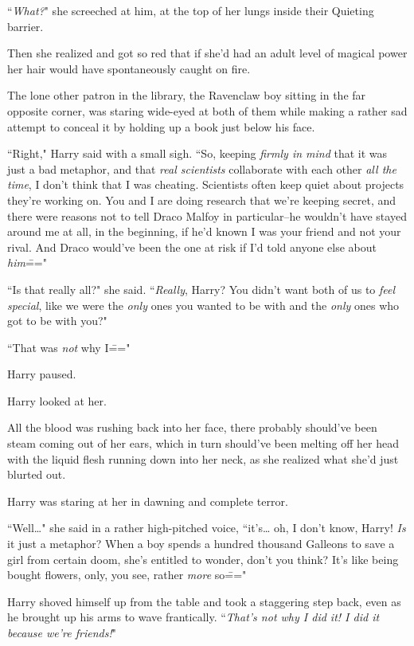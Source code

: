 ``\emph{What?}" she screeched at him, at the top of her lungs inside their Quieting barrier.

Then she realized and got so red that if she'd had an adult level of magical power her hair would have spontaneously caught on fire.

The lone other patron in the library, the Ravenclaw boy sitting in the far opposite corner, was staring wide-eyed at both of them while making a rather sad attempt to conceal it by holding up a book just below his face.

``Right," Harry said with a small sigh. ``So, keeping \emph{firmly in mind} that it was just a bad metaphor, and that \emph{real scientists} collaborate with each other \emph{all the time}, I don't think that I was cheating. Scientists often keep quiet about projects they're working on. You and I are doing research that we're keeping secret, and there were reasons not to tell Draco Malfoy in particular\---he wouldn't have stayed around me at all, in the beginning, if he'd known I was your friend and not your rival. And Draco would've been the one at risk if I'd told anyone else about \emph{him}\==="

``Is that really all?" she said. ``\emph{Really}, Harry? You didn't want both of us to \emph{feel special}, like we were the \emph{only} ones you wanted to be with and the \emph{only} ones who got to be with you?"

``That was \emph{not} why I\==="

Harry paused.

Harry looked at her.

All the blood was rushing back into her face, there probably should've been steam coming out of her ears, which in turn should've been melting off her head with the liquid flesh running down into her neck, as she realized what she'd just blurted out.

Harry was staring at her in dawning and complete terror.

``Well{\ldots}" she said in a rather high-pitched voice, ``it's{\ldots} oh, I don't know, Harry! \emph{Is} it just a metaphor? When a boy spends a hundred thousand Galleons to save a girl from certain doom, she's entitled to wonder, don't you think? It's like being bought flowers, only, you see, rather \emph{more} so\==="

Harry shoved himself up from the table and took a staggering step back, even as he brought up his arms to wave frantically. ``\emph{That's not why I did it! I did it because we're friends!}"

